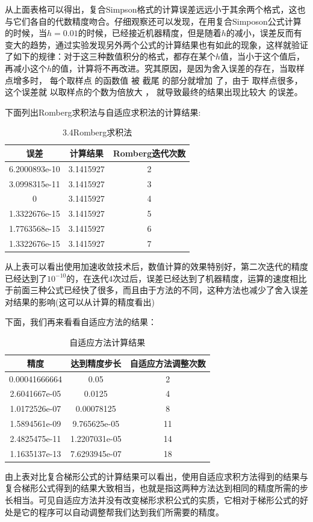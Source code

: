 \documentclass[10pt,a4paper]{ctexart}
\begin{document}
从上面表格可以得出，复合Simpson格式的计算误差远远小于其余两个格式，这也与它们各自的代数精度吻合。仔细观察还可以发现，在用复合Simposon公式计算的时候，当$h=0.01$的时候，已经接近机器精度，但是随着$h$的减小，误差反而有变大的趋势，通过实验发现另外两个公式的计算结果也有如此的现象，这样就验证了如下的规律：对于这三种数值积分的格式，都存在某个$h$值，当小于这个值后，再减小这个$h$的值，计算将不再改进。究其原因，是因为舍入误差的存在，当取样点增多时， 每个取样点 的函数值 被 截尾 的部分就增加 了，由于 取样点很多，这个误差就 以取样点的个数为倍放大 ， 就导致最终的结果出现比较大 的误差。

下面列出Romberg求积法与自适应求积法的计算结果:
\begin{center}
\begin{longtable}{|c|c|c|}
\caption{3.4Romberg求积法}\\
\hline
误差& 计算结果& Romberg迭代次数\\
\hline
6.2000893e-10& 3.1415927& 2\\
\hline
3.0998315e-11& 3.1415927& 3\\
\hline
0& 3.1415927& 4\\
\hline
1.3322676e-15& 3.1415927& 5\\
\hline
1.7763568e-15& 3.1415927& 6\\
\hline
1.3322676e-15& 3.1415927& 7\\
\hline
\end{longtable}
\end{center}
从上表可以看出使用加速收敛技术后，数值计算的效果特别好，第二次迭代的精度已经达到了$10^{-10}$的，在迭代4次过后，误差已经达到了机器精度，运算的速度相比于前面三种公式已经快了很多，而且由于方法的不同，这种方法也减少了舍入误差对结果的影响(这可以从计算的精度看出)

下面，我们再来看看自适应方法的结果：
\begin{center}
\begin{longtable}{|c|c|c|}
\caption{自适应方法计算结果}\\
\hline
精度& 达到精度步长& 自适应方法调整次数\\
\hline
0.00041666664& 0.05& 2\\
\hline
2.6041667e-05& 0.0125& 4\\
\hline
1.0172526e-07& 0.00078125& 8\\
\hline
1.5894561e-09& 9.765625e-05& 11\\
\hline
2.4825475e-11& 1.2207031e-05& 14\\
\hline
1.1635137e-13& 7.6293945e-07& 18\\
\hline
\end{longtable}
\end{center}
由上表对比复合梯形公式的计算结果可以看出，使用自适应求积方法得到的结果与复合梯形公式得到的结果大致相当，也就是指这两种方法达到相同的精度所需的步长相当。可见自适应方法并没有改变梯形求积公式的实质，它相对于梯形公式的好处是它的程序可以自动调整帮我们达到我们所需要的精度。
\end{document}
